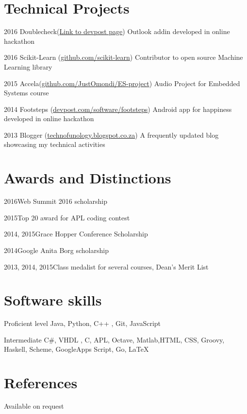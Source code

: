 \documentclass[fontsize=9pt]{tccv}
\begin{document}
\section{Technical Projects}

\begin{yearlist}

\item{2016}
     {Doublecheck(\href{http://devpost.com/software/doublecheck}{Link to devpost page})}
     {Outlook addin developed in online hackathon}

\item{2016}
     {Scikit-Learn (\href{https://github.com/imaculate/scikit-learn}{github.com/scikit-learn})}
     {Contributor to open source Machine Learning library}

\item{2015}
     {Accela(\href{https://github.com/JustOmondi/ES-project}{github.com/JustOmondi/ES-project})}
     {Audio Project for Embedded Systems course}

\item{2014}
{Footsteps (\href{http://devpost.com/software/footsteps}{devpost.com/software/footsteps})}
{Android app for happiness developed in online hackathon}

\item{2013}
     {Blogger (\href{http://technofunology.blogspot.co.za/}{technofunology.blogspot.co.za})}
     {A frequently updated blog showcasing my technical activities}

\end{yearlist}

\section{Awards and Distinctions}

\begin{factlist}
\item{2016}{Web Summit 2016 scholarship}
\item{2015}{Top 20 award for APL coding contest}
\item{2014, 2015}{Grace Hopper Conference Scholarship }
\item{2014}{Google Anita Borg scholarship}
\item{2013, 2014, 2015}{Class medalist for several courses, Dean's Merit List}
\end{factlist}

\section{Software skills}

\begin{factlist}

\item{Proficient level}
     {Java, Python, C++ , Git, JavaScript}

\item{Intermediate}
     { C\#, VHDL , C, APL, Octave, Matlab,HTML, CSS, Groovy,
     Haskell, Scheme, GoogleApps Script,  Go, \LaTeX}

\end{factlist}


\section{References}
Available on request
\end{document}
